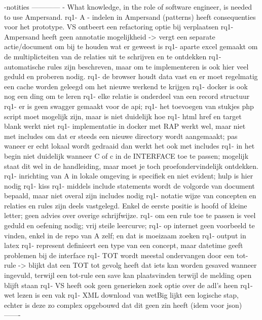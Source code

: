 -notities
\newline
------------
\newline
[RQ1]- What knowledge, in the role of software engineer, is needed to use Ampersand.
rq1- A - indelen in Ampersand (patterns) heeft consequenties voor het prototype. VS ontbeert een refactoring optie bij verplaatsen
rq1- Ampersand heeft geen annotatie mogelijkheid -> vergt een separate actie/document om bij te houden wat er geweest is
rq1- aparte excel gemaakt om de multiplicteiten van de relaties uit te schrijven en te ontdekken
rq1- automatische rules zijn beschreven, maar om te implementeren is ook hier veel geduld en proberen nodig. 
rq1- de browser houdt data vast en er moet regelmatig een cache worden geleegd om het nieuwe werkend te krijgen
rq1- docker is ook nog een ding om te leren
rq1- elke relatie is onderdeel van een record structuur
rq1- er is geen swagger gemaakt voor de api; 
rq1- het toevoegen van stukjes php script moet mogelijk zijn, maar is niet duidelijk hoe
rq1- html href en target blank werkt niet
rq1- implementatie in docker met RAP werkt wel, maar niet met includes om dat er steeds een nieuwe directory wordt aangemaakt; pas waneer er echt lokaal wordt gedraaid dan werkt het ook met includes
rq1- in het begin niet duidelijk wanneer C of c in de INTERFACE toe te passen; mogelijk staat dit wel in de handleiding, maar moet je toch proefondervindelijk ontdekken.
rq1- inrichting van A in lokale omgeving is specifiek en niet evident; hulp is hier nodig
rq1- kiss
rq1- middels include statements wordt de volgorde van document bepaald, maar niet overal zijn includes nodig
rq1- notatie wijze van concepten en relaties en rules zijn deels vastgelegd. Enkel de eerste positie is hoofd of kleine letter; geen advies over overige schrijfwijze.
rq1- om een rule toe te passen is veel geduld en oefening nodig; vrij steile leercurve; 
rq1- op internet geen voorbeeld te vinden, enkel in de repo van A zelf; en dat is moeizaam zoeken
rq1- output in latex 
rq1- represent definieert een type van een concept, maar datetime geeft problemen bij de interface
rq1- TOT wordt meestal ondervangen door een tot-rule -> blijkt dat een TOT tot gevolg heeft dat iets kan worden gesaved wanneer ingevuld, terwijl een tot-rule een save kan plaatsvinden terwijl de melding open blijft staan
rq1- VS heeft ook geen generieken zoek optie over de adl's heen
rq1- wet lezen is een vak 
rq1- XML download van wetBig lijkt een logische stap, echter is deze zo complex opgebouwd dat dit geen zin heeft (idem voor json)
\newline
-------
